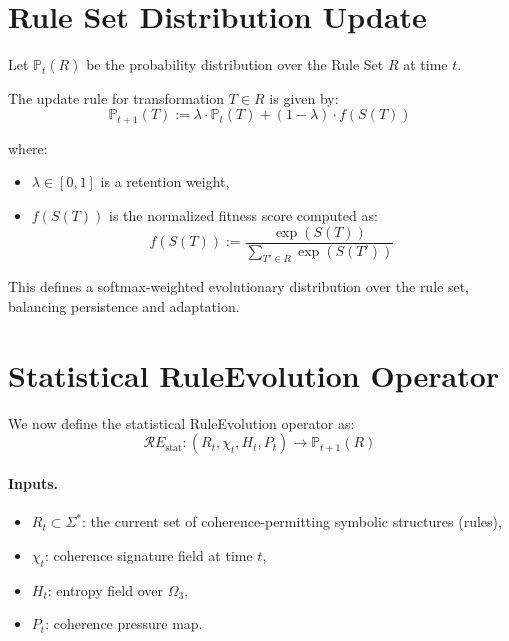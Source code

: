 \section{Rule Set Distribution Update} \label{rule-set-distribution-update}

Let $\mathbb{P}_t(R)$ be the probability distribution over the Rule Set $R$ at time $t$.

\begin{definition}
The update rule for transformation $T \in R$ is given by:
\begin{equation} \label{eq:rule-update}
\mathbb{P}_{t+1}(T) := \lambda \cdot \mathbb{P}_t(T) + (1 - \lambda) \cdot f(S(T))
\end{equation}
\end{definition}

where:
\begin{itemize}
    \item $\lambda \in [0, 1]$ is a retention weight,
    \item $f(S(T))$ is the normalized fitness score computed as:
    \begin{equation} \label{eq:fitness-softmax}
    f(S(T)) := \frac{\exp(S(T))}{\sum_{T' \in R} \exp(S(T'))}
    \end{equation}
\end{itemize}

This defines a softmax-weighted evolutionary distribution over the rule set, balancing persistence and adaptation.

\section{Statistical RuleEvolution Operator} \label{statistical-ruleevolution-operator}

We now define the statistical RuleEvolution operator as:
\begin{equation} \label{eq:RE-stat-operator}
\mathcal{R}E_{\text{stat}} : (R_t, \chi_t, H_t, P_t) \longrightarrow \mathbb{P}_{t+1}(R)
\end{equation}

\paragraph{Inputs.}
\begin{itemize}
    \item $R_t \subset \Sigma^*$: the current set of coherence-permitting symbolic structures (rules),
    \item $\chi_t$: coherence signature field at time $t$,
    \item $H_t$: entropy field over $\Omega_3$,
    \item $P_t$: coherence pressure map.
\end{itemize}

